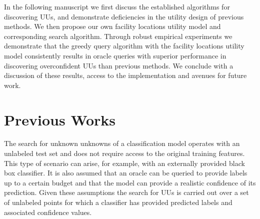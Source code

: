 \documentclass[letterpaper]{article} %
\begin{document}


In the following manuscript we first discuss the established algorithms for discovering UUs, and demonstrate deficiencies in the utility design of previous methods. We then propose our own facility locations utility model and corresponding search algorithm. Through robust empirical experiments we demonstrate that the greedy query algorithm with the facility locations utility model consistently results in oracle queries with superior performance in discovering overconfident UUs than previous methods. We conclude with a discussion of these results, access to the implementation and avenues for future work.

\section{Previous Works}

The search for unknown unknowns of a classification model operates with an unlabeled test set and does not require access to the original training features. This type of scenario can arise, for example, with an externally provided black box classifier.  It is also assumed that an oracle can be queried to provide labels up to a certain budget and that the model can provide a realistic confidence of its prediction. Given these assumptions the search for UUs is carried out over a set of unlabeled points for which a classifier has provided predicted labels and associated confidence values.  
\end{document}
